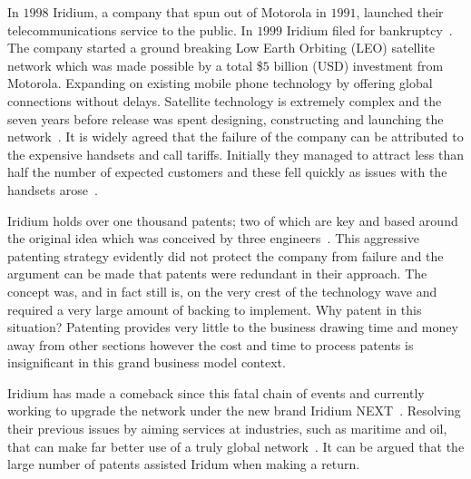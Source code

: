{}

In $1998$ Iridium, a company that spun out of Motorola in $1991$, launched their telecommunications service to the public.
In $1999$ Iridium filed for bankruptcy~\cite{fink2000iridium}.%
The company started a ground breaking Low Earth Orbiting (LEO) satellite network which was made possible by a total \$$5$ billion (USD) investment from Motorola.
Expanding on existing mobile phone technology by offering global connections without delays.
Satellite technology is extremely complex and the seven years before release was spent designing, constructing and launching the network~\cite{fink2000iridium}. 
It is widely agreed that the failure of the company can be attributed to the expensive handsets and call tariffs.
Initially they managed to attract less than half the number of expected customers and these fell quickly as issues with the handsets arose~\cite{bill1999}.


Iridium holds over one thousand patents; two of which are key and based around the original idea which was conceived by three engineers~\cite{ip2010,bertiger1995satellite,bertiger1997satellite}.
This aggressive patenting strategy evidently did not protect the company from failure and the argument can be made that patents were redundant in their approach.
The concept was, and in fact still is, on the very crest of the technology wave and required a very large amount of backing to implement.
Why patent in this situation?
Patenting provides very little to the business drawing time and money away from other sections however the cost and time to process patents is insignificant in this grand business model context.


Iridium has made a comeback since this fatal chain of events and currently working to upgrade the network under the new brand Iridium NEXT~\cite{iridiumNEXT}.
Resolving their previous issues by aiming services at industries, such as maritime and oil, that can make far better use of a truly global network~\cite{better2009}.
It can be argued that the large number of patents assisted Iridum when making a return.  

